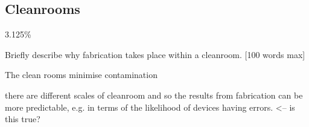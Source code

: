 \subsection{Cleanrooms}
\label{sec:fab:cleanrooms}

3.125\%

Briefly describe why fabrication takes place within a cleanroom. [100 words max]

The clean rooms minimise contamination

there are different scales of cleanroom and so the results from fabrication can be more predictable, e.g. in terms of the likelihood of devices having errors. <-- is this true?
